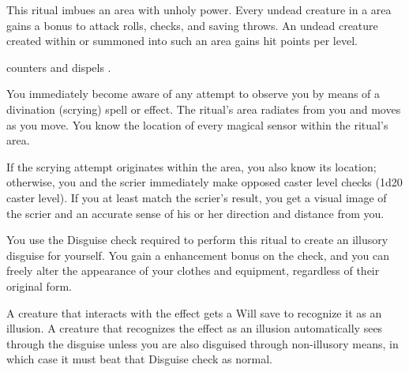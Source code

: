 \spellrng{\rngclose}
\begin{spelleffect}
This ritual imbues an area with unholy power. Every undead creature in a  area gains a  bonus to attack rolls, checks, and saving throws. An undead creature created within or summoned into such an area gains  hit points per level.
\end{spelleffect}
\begin{spellnotes}
 counters and dispels .
\end{spellnotes}

\spelldur{\durext}
\begin{spelleffect}
You immediately become aware of any attempt to observe you by means of a divination (scrying) spell or effect. The ritual's area radiates from you and moves as you move. You know the location of every magical sensor within the ritual's area.
\par If the scrying attempt originates within the area, you also know its location; otherwise, you and the scrier immediately make opposed caster level checks (1d20 \add caster level). If you at least match the scrier's result, you get a visual image of the scrier and an accurate sense of his or her direction and distance from you.
\end{spelleffect}

\spellrng{\rngpers}
\begin{spelleffect}
    You use the Disguise check required to perform this ritual to create an illusory disguise for yourself. You gain a  enhancement bonus on the check, and you can freely alter the appearance of your clothes and equipment, regardless of their original form.
\end{spelleffect}
\begin{spellnotes}
  A creature that interacts with the effect gets a Will save to recognize it as an illusion. A creature that recognizes the effect as an illusion automatically sees through the disguise unless you are also disguised through non-illusory means, in which case it must beat that Disguise check as normal.
\end{spellnotes}

